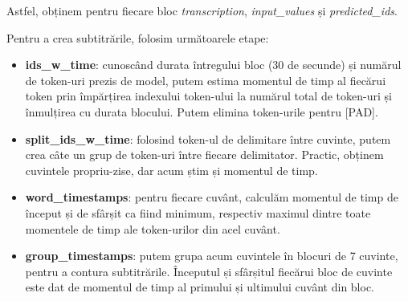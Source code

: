 Astfel, obținem pentru fiecare bloc \textit{transcription}, \textit{input\_values} și \textit{predicted\_ids}.

\par
Pentru a crea subtitrările, folosim următoarele etape:

\begin{itemize}
    \item \textbf{ids\_w\_time}: cunoscând durata întregului bloc (30 de secunde) și numărul de token-uri
    prezis de model, putem estima momentul de timp al fiecărui token prin împărțirea indexului token-ului
    la numărul total de token-uri și înmulțirea cu durata blocului. Putem elimina token-urile pentru [PAD].
    \item \textbf{split\_ids\_w\_time}: folosind token-ul de delimitare între cuvinte, putem crea câte un 
    grup de token-uri între fiecare delimitator. Practic, obținem cuvintele propriu-zise, dar acum știm și
    momentul de timp.
    \item \textbf{word\_timestamps}: pentru fiecare cuvânt, calculăm momentul de timp de început și de sfârșit
    ca fiind minimum, respectiv maximul dintre toate momentele de timp ale token-urilor din acel cuvânt.
    \item \textbf{group\_timestamps}: putem grupa acum cuvintele în blocuri de 7 cuvinte, pentru a contura
    subtitrările. Începutul și sfârșitul fiecărui bloc de cuvinte este dat de momentul de timp al primului
    și ultimului cuvânt din bloc.
\end{itemize}

